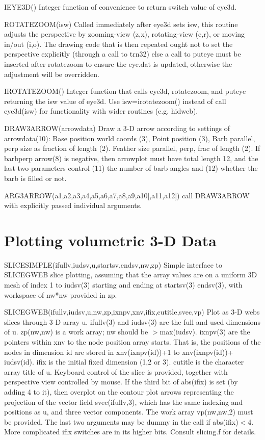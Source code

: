 \documentclass[12pt]{article}
\newif \iftth
\begin{document}
IEYE3D() Integer function of convenience to return switch value of eye3d.

ROTATEZOOM(isw) Called immediately after eye3d sets isw, this routine
adjusts the perspective by zooming-view (z,x), rotating-view (e,r), or
moving in/out (i,o). The drawing code that is then repeated ought not
to set the perspective explicitly (through a call to trn32) else a
call to puteye must be inserted after rotatezoom to ensure the eye.dat
is updated, otherwise the adjustment will be overridden.

IROTATEZOOM() Integer function that calls eye3d, rotatezoom, and
puteye returning the isw value of eye3d. Use isw=irotatezoom() instead
of call eye3d(isw) for functionality with wider routines (e.g. hidweb). 

DRAW3ARROW(arrowdata) Draw a 3-D arrow according to settings of
arrowdata(10): Base position world coords (3), Point position (3),
Barb parallel, perp size as fraction of length (2). 
Feather size parallel, perp, frac of length (2). If barbperp arrow(8)
is negative, then arrowplot must have total length 12, and the last
two parameters control (11) the number of barb angles and (12) whether the barb
is filled or not.

ARG3ARROW(a1,a2,a3,a4,a5,a6,a7,a8,a9,a10[,a11,a12]) call DRAW3ARROW
with explicitly passed individual arguments.

\section{Plotting volumetric 3-D Data}

\iftth \special{html:<a href="slicetest.f"><img align="left"
src="sgweb.jpg" width="400"></a>}\fi


SLICESIMPLE(ifullv,iudsv,u,startsv,endsv,nw,zp) Simple interface to
SLICEGWEB slice plotting, assuming that the array values are on a
uniform 3D mesh of index 1 to iudsv(3) starting and ending at startsv(3)
endsv(3), with workspace of nw*nw provided in zp.


SLICEGWEB(ifullv,iudsv,u,nw,zp,ixnpv,xnv,ifix,cutitle,svec,vp) Plot
as 3-D webs slices through 3-D array u. ifullv(3) and iudsv(3) are the
full and used dimensions of u. zp(nw,nw) is a work array; nw should be
$>$max(iudsv). ixnpv(3) are the pointers within xnv to the node
position array starts. That is, the positions of the nodes in
dimension id are stored in xnv(ixnpv(id))+1 to xnv(ixnpv(id))+
iudsv(id). ifix is the initial fixed dimension (1,2 or 3). cutitle is
the character array title of u. Keyboard control of the slice is
provided, together with perspective view controlled by mouse. If the
third bit of abs(ifix) is set (by adding 4 to it), then overplot on
the contour plot arrows representing the projection of the vector
field svec(ifullv,3), which has the same indexing and positions as u,
and three vector components. The work array vp(nw,nw,2) must be
provided.  The last two arguments may be dummy in the call if
abs(ifix)$<$4. More complicated ifix switches are in its higher bits.
Consult slicing.f for details.
\end{document}
